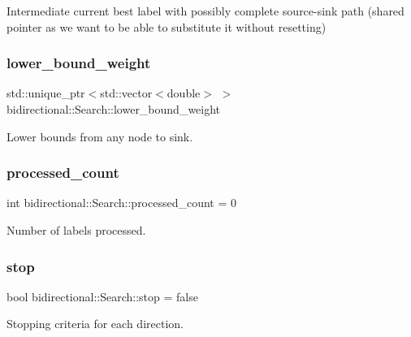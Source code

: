 Intermediate current best label with possibly complete source-\/sink path (shared pointer as we want to be able to substitute it without resetting) \mbox{\label{classbidirectional_1_1Search_ac06fcd122e7d2bb99e493c9a82cbecd1}} 
\subsubsection{\texorpdfstring{lower\+\_\+bound\+\_\+weight}{lower\_bound\_weight}}
{\footnotesize\ttfamily std\+::unique\+\_\+ptr$<$std\+::vector$<$double$>$ $>$ bidirectional\+::\+Search\+::lower\+\_\+bound\+\_\+weight}



Lower bounds from any node to sink. 

\mbox{\label{classbidirectional_1_1Search_a951da4144a4cf70e3288d0c5898769b9}} 
\subsubsection{\texorpdfstring{processed\+\_\+count}{processed\_count}}
{\footnotesize\ttfamily int bidirectional\+::\+Search\+::processed\+\_\+count = 0}



Number of labels processed. 

\mbox{\label{classbidirectional_1_1Search_a0d03b4c804f947b14f7ec603d7005055}} 
\subsubsection{\texorpdfstring{stop}{stop}}
{\footnotesize\ttfamily bool bidirectional\+::\+Search\+::stop = false}



Stopping criteria for each direction. 

